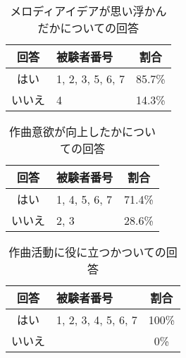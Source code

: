 \begin{table}[htbp]
  \begin{center}
    \caption{メロディアイデアが思い浮かんだかについての回答}
    \begin{tabular}{|c|p{10em}|c|}
      \hline
      回答 & 被験者番号 & 割合\rule[-3mm]{0mm}{8mm} \\ \hline \hline
      はい & 1, 2, 3, 5, 6, 7 & 85.7\% \rule[-3mm]{0mm}{8mm} \\ \hline
      いいえ & 4 & 14.3\% \rule[-3mm]{0mm}{8mm} \\ \hline
    \end{tabular}
  \end{center}
\end{table}

\begin{table}[htbp]
  \begin{center}
    \caption{作曲意欲が向上したかについての回答}
    \begin{tabular}{|c|p{10em}|c|}
      \hline
      回答 & 被験者番号 & 割合\rule[-3mm]{0mm}{8mm} \\ \hline \hline
      はい & 1, 4, 5, 6, 7 & 71.4\% \rule[-3mm]{0mm}{8mm} \\ \hline
      いいえ & 2, 3 & 28.6\% \rule[-3mm]{0mm}{8mm} \\ \hline
    \end{tabular}
  \end{center}
\end{table}

\begin{table}[htbp]
  \begin{center}
    \caption{作曲活動に役に立つかついての回答}
    \begin{tabular}{|c|p{10em}|c|}
      \hline
      回答 & 被験者番号 & 割合\rule[-3mm]{0mm}{8mm} \\ \hline \hline
      はい & 1, 2, 3, 4, 5, 6, 7 & 100\% \rule[-3mm]{0mm}{8mm} \\ \hline
      いいえ &  & 0\% \rule[-3mm]{0mm}{8mm} \\ \hline
    \end{tabular}
  \end{center}
\end{table}

